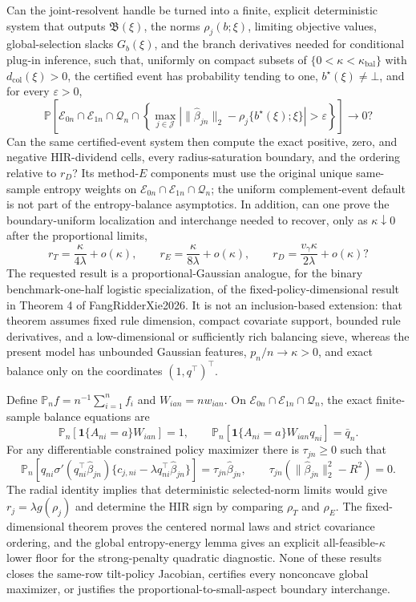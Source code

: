 Can the joint-resolvent handle be turned into a finite, explicit deterministic system that outputs \(\mathfrak B(\xi)\), the norms \(\rho_j(b;\xi)\), limiting objective values, global-selection slacks \(G_b(\xi)\), and the branch derivatives needed for conditional plug-in inference, such that, uniformly on compact subsets of \(\{0<\kappa<\kappa_{\mathrm{bal}}\}\) with \(d_{\mathrm{col}}(\xi)>0\), the certified event has probability tending to one, \(b^\star(\xi)\ne\bot\), and for every \(\varepsilon>0\),
\[
 \mathbb P\!\left[
 \mathcal E_{0n}\cap\mathcal E_{1n}\cap\mathcal Q_n\cap
 \left\{\max_{j\in\mathcal J}
 \left|\|\widehat\beta_{jn}\|_2-
 \rho_j\{b^\star(\xi);\xi\}\right|>\varepsilon\right\}
 \right]\longrightarrow0?
\]
Can the same certified-event system then compute the exact positive, zero, and negative HIR-dividend cells, every radius-saturation boundary, and the ordering relative to \(r_D\)?  Its method-\(E\) components must use the original unique same-sample entropy weights on \(\mathcal E_{0n}\cap\mathcal E_{1n}\cap\mathcal Q_n\); the uniform complement-event default is not part of the entropy-balance asymptotics.  In addition, can one prove the boundary-uniform localization and interchange needed to recover, only as \(\kappa\downarrow0\) after the proportional limits,
\[
 r_T=\frac{\kappa}{4\lambda}+o(\kappa),
 \qquad
 r_E=\frac{\kappa}{8\lambda}+o(\kappa),
 \qquad
 r_D=\frac{v_\gamma\kappa}{2\lambda}+o(\kappa)?
\]
The requested result is a proportional-Gaussian analogue, for the binary benchmark-one-half logistic specialization, of the fixed-policy-dimensional result in Theorem 4 of FangRidderXie2026.  It is not an inclusion-based extension: that theorem assumes fixed rule dimension, compact covariate support, bounded rule derivatives, and a low-dimensional or sufficiently rich balancing sieve, whereas the present model has unbounded Gaussian features, \(p_n/n\to\kappa>0\), and exact balance only on the coordinates \((1,q^\top)^\top\).

Define \(\mathbb P_nf=n^{-1}\sum_{i=1}^nf_i\) and \(W_{ian}=nw_{ian}\).  On \(\mathcal E_{0n}\cap\mathcal E_{1n}\cap\mathcal Q_n\), the exact finite-sample balance equations are
\[
 \mathbb P_n[\mathbf1\{A_{ni}=a\}W_{ian}]=1,
 \qquad
 \mathbb P_n[\mathbf1\{A_{ni}=a\}W_{ian}q_{ni}]=\bar q_n.
\]
For any differentiable constrained policy maximizer there is \(\tau_{jn}\ge0\) such that
\[
 \mathbb P_n\!\left[q_{ni}\sigma'(q_{ni}^\top\widehat\beta_{jn})
 \{c_{j,ni}-\lambda q_{ni}^\top\widehat\beta_{jn}\}\right]
 =\tau_{jn}\widehat\beta_{jn},
 \qquad
 \tau_{jn}(\|\widehat\beta_{jn}\|_2^2-R^2)=0.
\]
The radial identity implies that deterministic selected-norm limits would give \(r_j=\lambda g(\rho_j)\) and determine the HIR sign by comparing \(\rho_T\) and \(\rho_E\).  The fixed-dimensional theorem proves the centered normal laws and strict covariance ordering, and the global entropy-energy lemma gives an explicit all-feasible-\(\kappa\) lower floor for the strong-penalty quadratic diagnostic.  None of these results closes the same-row tilt-policy Jacobian, certifies every nonconcave global maximizer, or justifies the proportional-to-small-aspect boundary interchange.

